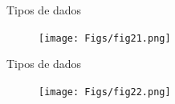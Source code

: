\documentclass[aspectratio=169]{beamer}
\begin{document}
%	
%	
%	
%	
%	
%	
%
%	










\begin{frame}{Tipos de dados}
	\justifying
	

	
	\begin{figure}[h]
		\centering
		\texttt{[image: Figs/fig21.png]}
	\end{figure}
	
	
	
	
\end{frame}

\begin{frame}{Tipos de dados}
	\justifying
	
	
	
	
	
	
	\begin{figure}[h]
		\centering
		\texttt{[image: Figs/fig22.png]}
	\end{figure}	
	
\end{frame}
\end{document}
